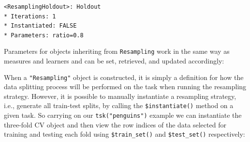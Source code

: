 \begin{Shaded}
\begin{Highlighting}[]
\NormalTok{(}\NormalTok{, } \NormalTok{)}
\end{Highlighting}
\end{Shaded}

\begin{verbatim}
<ResamplingHoldout>: Holdout
* Iterations: 1
* Instantiated: FALSE
* Parameters: ratio=0.8
\end{verbatim}

Parameters for objects inheriting from \texttt{Resampling} work in the
same way as measures and learners and can be set, retrieved, and updated
accordingly:

\begin{Shaded}
\begin{Highlighting}[]
\OtherTok{=} \NormalTok{(}\NormalTok{, } \NormalTok{)}
\OtherTok{=} \NormalTok{(}\NormalTok{, } \NormalTok{, } \NormalTok{)}
\OtherTok{=} \NormalTok{(}\NormalTok{, } \NormalTok{, } \NormalTok{)}
\end{Highlighting}
\end{Shaded}

When a \texttt{"Resampling"} object is constructed, it is simply a
definition for how the data splitting process will be performed on the
task when running the resampling strategy. However, it is possible to
manually instantiate a resampling strategy, i.e., generate all
train-test splits, by calling the
\texttt{\$instantiate()}
method on a given task. So carrying on our \texttt{tsk("penguins")}
example we can instantiate the three-fold CV object and then view the
row indices of the data selected for training and testing each fold
using \texttt{\$train\_set()} and \texttt{\$test\_set()} respectively:

